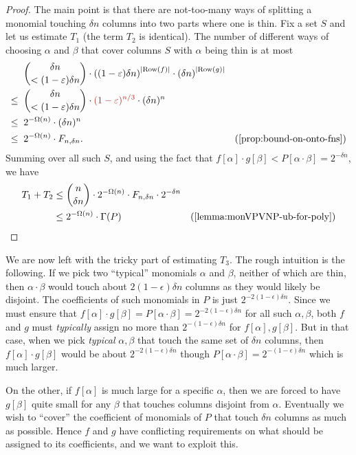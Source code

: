\begin{proof}
  The main point is that there are not-too-many ways of splitting a monomial touching $\delta n$ columns into two parts where one is thin.
  Fix a set $S$ and let us estimate $T_1$ (the term $T_2$ is identical).
  The number of different ways of choosing $\alpha$ and $\beta$ that cover columns $S$ with $\alpha$ being thin is at most
  \begin{align*}
    & \;\; \binom{\delta n}{< (1 - \epsilon)\delta n} \cdot \inparen{(1- \epsilon)\delta n}^{\abs{\Row(f)}} \cdot \inparen{\delta n}^{\abs{\Row(g)}}\\
    \leq & \;\; \binom{\delta n}{< (1 - \epsilon)\delta n} \cdot \textcolor{BrickRed}{(1 - \epsilon)^{n/3}} \cdot (\delta n)^n \\
    \leq & \;\; 2^{-\Omega(n)} \cdot (\delta n)^n\\
    \leq & \;\; 2^{-\Omega(n)} \cdot F_{n,\delta n}. &\text{(\autoref{prop:bound-on-onto-fns})}
  \end{align*}
  Summing over all such $S$, and using the fact that $f[\alpha] \cdot g[\beta] < P[\alpha \cdot \beta] = 2^{-\delta n}$, we have
  \begin{align*}
    T_1 + T_2 & \leq \binom{n}{\delta n} \cdot 2^{- \Omega(n)} \cdot F_{n,\delta n} \cdot 2^{-\delta n} \\
    & \leq 2^{-\Omega(n)} \cdot \Gamma(P) & \text{(\autoref{lemma:monVPVNP-ub-for-poly})}
  \end{align*}
\end{proof}

\noindent
We are now left with the tricky part of estimating $T_3$.
The rough intuition is the following.
If we pick two ``typical'' monomials $\alpha$ and $\beta$, neither of which are thin, then $\alpha \cdot \beta$ would touch about $2(1-\epsilon)\delta n$ columns as they would likely be disjoint.
The coefficients of such monomials in $P$ is just $2^{-2(1-\epsilon)\delta n}$.
Since we must ensure that $f[\alpha] \cdot g[\beta] = P[\alpha\cdot \beta] = 2^{-2(1-\epsilon)\delta n}$ for all such $\alpha,\beta$, both $f$ and $g$ must \emph{typically} assign no more than $2^{-(1-\epsilon)\delta n}$ for $f[\alpha], g[\beta]$. But in that case, when we pick \emph{typical} $\alpha,\beta$ that touch the same set of $\delta n$ columns, then $f[\alpha] \cdot g[\beta]$ would be about $2^{-2(1-\epsilon)\delta n}$ though $P[\alpha \cdot \beta] = 2^{-(1-\epsilon)\delta n}$ which is much larger.

On the other, if $f[\alpha]$ is much large for a specific $\alpha$, then we are forced to have $g[\beta]$ quite small for any $\beta$ that touches columns disjoint from $\alpha$. Eventually we wish to ``cover'' the coefficient of monomials of $P$ that touch $\delta n$ columns as much as possible.
Hence $f$ and $g$ have conflicting requirements on what should be assigned to its coefficients, and we want to exploit this.

